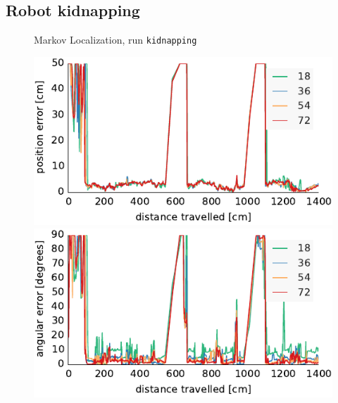 \documentclass[letterpaper, 10pt, conference]{ieeeconf}
\begin{document}
\subsection{Robot kidnapping}

\begin{figure}

\begin{center}
Markov Localization, run \texttt{kidnapping}
\end{center}
\includegraphics{ml-whole_random_long-xy}\hfill
\includegraphics{ml-whole_random_long-theta}

\vspace{.5em}


\end{figure}
\end{document}
